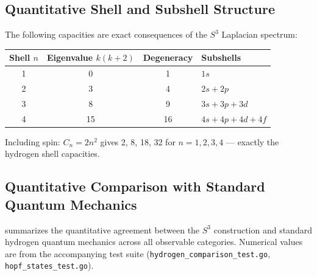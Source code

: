 \documentclass[12pt, a4paper]{article}
\theoremstyle{definition}
\theoremstyle{remark}
\newcommand{\Sthree}{S^3}
\begin{document}
\subsection{Quantitative Shell and Subshell Structure}

The following capacities are exact consequences of the $\Sthree$ Laplacian
spectrum:

\begin{center}
\renewcommand{\arraystretch}{1.2}
\begin{tabular}{cccl}
\toprule
Shell $n$ & Eigenvalue $k(k+2)$ & Degeneracy & Subshells \\
\midrule
1 & 0 & 1 & $1s$ \\
2 & 3 & 4 & $2s + 2p$ \\
3 & 8 & 9 & $3s + 3p + 3d$ \\
4 & 15 & 16 & $4s + 4p + 4d + 4f$ \\
\bottomrule
\end{tabular}
\end{center}

Including spin: $C_n = 2n^2$ gives 2, 8, 18, 32 for $n = 1, 2, 3, 4$ ---
exactly the hydrogen shell capacities.

\subsection{Quantitative Comparison with Standard Quantum Mechanics}

 summarizes the quantitative agreement between the
$\Sthree$ construction and standard hydrogen quantum mechanics across all
observable categories. Numerical values are from the accompanying test
suite (\texttt{hydrogen\_comparison\_test.go}, \texttt{hopf\_states\_test.go}).
\end{document}
